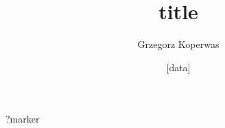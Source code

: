 \documentclass[a4paper,12pt]{article}
\title{title}
\author{Grzegorz Koperwas}
\date{[data]}
\begin{document}
?marker
\end{document}
